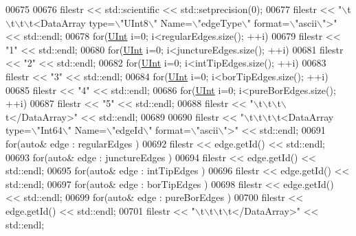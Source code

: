 \begin{DoxyCode}
00675 
00676     filestr << std::scientific << std::setprecision(0);
00677     filestr << \textcolor{stringliteral}{"\(\backslash\)t\(\backslash\)t\(\backslash\)t\(\backslash\)t<DataArray type=\(\backslash\)"UInt8\(\backslash\)" Name=\(\backslash\)"edgeType\(\backslash\)" format=\(\backslash\)"ascii\(\backslash\)">"} << std::endl;
00678     \textcolor{keywordflow}{for}(\hyperlink{namespaceFVCode3D_a4bf7e328c75d0fd504050d040ebe9eda}{UInt} i=0; i<regularEdges.size(); ++i)
00679         filestr << \textcolor{stringliteral}{"1"} << std::endl;
00680     \textcolor{keywordflow}{for}(\hyperlink{namespaceFVCode3D_a4bf7e328c75d0fd504050d040ebe9eda}{UInt} i=0; i<junctureEdges.size(); ++i)
00681         filestr << \textcolor{stringliteral}{"2"} << std::endl;
00682     \textcolor{keywordflow}{for}(\hyperlink{namespaceFVCode3D_a4bf7e328c75d0fd504050d040ebe9eda}{UInt} i=0; i<intTipEdges.size(); ++i)
00683         filestr << \textcolor{stringliteral}{"3"} << std::endl;
00684     \textcolor{keywordflow}{for}(\hyperlink{namespaceFVCode3D_a4bf7e328c75d0fd504050d040ebe9eda}{UInt} i=0; i<borTipEdges.size(); ++i)
00685         filestr << \textcolor{stringliteral}{"4"} << std::endl;
00686     \textcolor{keywordflow}{for}(\hyperlink{namespaceFVCode3D_a4bf7e328c75d0fd504050d040ebe9eda}{UInt} i=0; i<pureBorEdges.size(); ++i)
00687         filestr << \textcolor{stringliteral}{"5"} << std::endl;
00688     filestr << \textcolor{stringliteral}{"\(\backslash\)t\(\backslash\)t\(\backslash\)t\(\backslash\)t</DataArray>"} << std::endl;
00689 
00690     filestr << \textcolor{stringliteral}{"\(\backslash\)t\(\backslash\)t\(\backslash\)t\(\backslash\)t<DataArray type=\(\backslash\)"Int64\(\backslash\)" Name=\(\backslash\)"edgeId\(\backslash\)" format=\(\backslash\)"ascii\(\backslash\)">"} << std::endl;
00691     \textcolor{keywordflow}{for}(\textcolor{keyword}{auto}& edge : regularEdges )
00692         filestr << edge.getId() << std::endl;
00693     \textcolor{keywordflow}{for}(\textcolor{keyword}{auto}& edge : junctureEdges )
00694         filestr << edge.getId() << std::endl;
00695     \textcolor{keywordflow}{for}(\textcolor{keyword}{auto}& edge : intTipEdges )
00696         filestr << edge.getId() << std::endl;
00697     \textcolor{keywordflow}{for}(\textcolor{keyword}{auto}& edge : borTipEdges )
00698         filestr << edge.getId() << std::endl;
00699     \textcolor{keywordflow}{for}(\textcolor{keyword}{auto}& edge : pureBorEdges )
00700         filestr << edge.getId() << std::endl;
00701     filestr << \textcolor{stringliteral}{"\(\backslash\)t\(\backslash\)t\(\backslash\)t\(\backslash\)t</DataArray>"} << std::endl;

\end{DoxyCode}
